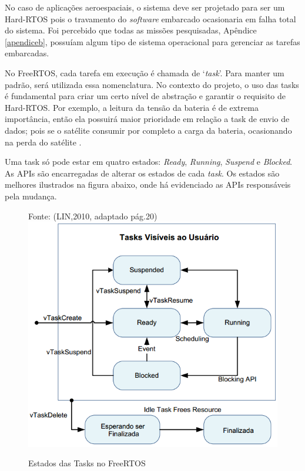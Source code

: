 No caso de aplicações aeroespaciais, o sistema deve ser projetado para ser um Hard-RTOS pois o travamento do \textit{software} embarcado ocasionaria em falha total do sistema. Foi percebido que todas as missões pesquisadas, Apêndice \ref{apendiceb}, possuíam algum tipo de sistema operacional para gerenciar as tarefas embarcadas.

No FreeRTOS, cada tarefa em execução é chamada de ‘\textit{task}’. Para manter um padrão, será utilizada essa nomenclatura. No contexto do projeto, o uso das tasks é fundamental para criar um certo nível de abstração e garantir o requisito de Hard-RTOS. Por exemplo, a leitura da tensão da bateria é de extrema importância, então ela possuirá maior prioridade em relação a task de envio de dados; pois se o satélite consumir por completo a carga da bateria, ocasionando na perda do satélite .

Uma task só pode estar em quatro estados: \textit{Ready}, \textit{Running}, \textit{Suspend} e \textit{Blocked}. As APIs são encarregadas de alterar os estados de cada \textit{task}. Os estados são melhores ilustrados na figura abaixo, onde há evidenciado as APIs responsáveis pela mudança.

\begin{figure}[h]
	\centering
	Fonte: (LIN,2010, adaptado pág.20) \includegraphics[keepaspectratio=true,scale=0.8]{figuras/freertosTasks.PNG}
	\caption{Estados das Tasks no FreeRTOS}
	\label{fig23}
\end{figure}

